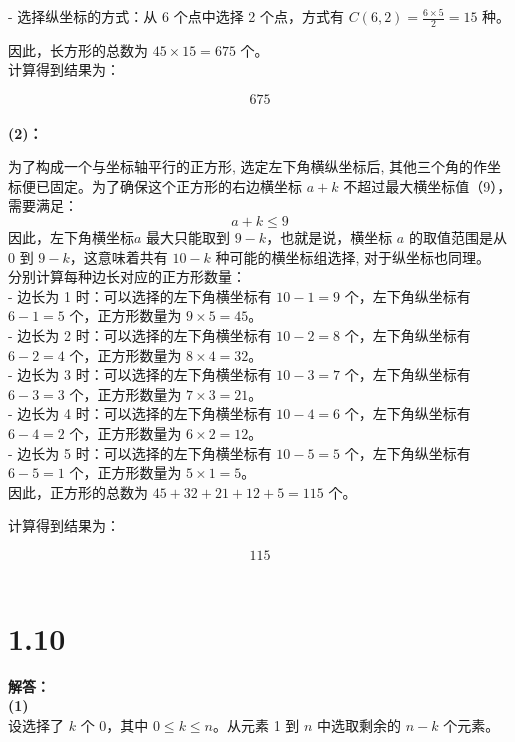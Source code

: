 \documentclass{article}
\begin{document}
- 选择纵坐标的方式：从 6 个点中选择 2 个点，方式有 \( C(6, 2) = \frac{6 \times 5}{2} = 15 \) 种。

因此，长方形的总数为 \( 45 \times 15 = 675 \) 个。\\

计算得到结果为：

\[
\boxed{675}
\] \\

\textbf{(2)：}

为了构成一个与坐标轴平行的正方形, 选定左下角横纵坐标后, 其他三个角的作坐标便已固定。为了确保这个正方形的右边横坐标 $a + k$ 不超过最大横坐标值（9），需要满足：
\[
a + k \leq 9
\]
因此，左下角横坐标$a$ 最大只能取到 $9 - k$，也就是说，横坐标 $a$ 的取值范围是从 $0$ 到 $9 - k$，这意味着共有 $10 - k$ 种可能的横坐标组选择, 对于纵坐标也同理。\\

分别计算每种边长对应的正方形数量：\\

- 边长为 1 时：可以选择的左下角横坐标有 \( 10 - 1 = 9 \) 个，左下角纵坐标有 \( 6 - 1 = 5 \) 个，正方形数量为 \( 9 \times 5 = 45 \)。\\

- 边长为 2 时：可以选择的左下角横坐标有 \( 10 - 2 = 8 \) 个，左下角纵坐标有 \( 6 - 2 = 4 \) 个，正方形数量为 \( 8 \times 4 = 32 \)。\\

- 边长为 3 时：可以选择的左下角横坐标有 \( 10 - 3 = 7 \) 个，左下角纵坐标有 \( 6 - 3 = 3 \) 个，正方形数量为 \( 7 \times 3 = 21 \)。\\

- 边长为 4 时：可以选择的左下角横坐标有 \( 10 - 4 = 6 \) 个，左下角纵坐标有 \( 6 - 4 = 2 \) 个，正方形数量为 \( 6 \times 2 = 12 \)。\\

- 边长为 5 时：可以选择的左下角横坐标有 \( 10 - 5 = 5 \) 个，左下角纵坐标有 \( 6 - 5 = 1 \) 个，正方形数量为 \( 5 \times 1 = 5 \)。\\

因此，正方形的总数为 \( 45 + 32 + 21 + 12 + 5 = 115 \) 个。

计算得到结果为：

\[
\boxed{115}
\] \\

\section*{1.10}
\textbf{解答：}\\
\textbf{(1)}\\
设选择了 $k$ 个 0，其中 $0 \leq k \leq n$。从元素 1 到 $n$ 中选取剩余的 $n - k$ 个元素。\\
\end{document}
